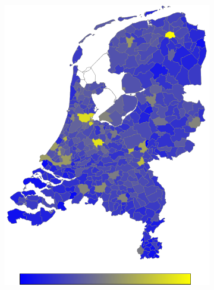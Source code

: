 \documentclass[a4paper,twoside,11pt]{article}
\begin{document}
\begin{figure}[h]
\begin{subfigure}[b]{0.118\textwidth}
                \includegraphics[width=\textwidth]{Heatmaps/HeatMap13.png}
                \caption{}
                \label{fig:notMarried}
        \end{subfigure}
        \begin{subfigure}[b]{0.118\textwidth}

\end{subfigure}
\end{figure}
\end{document}
